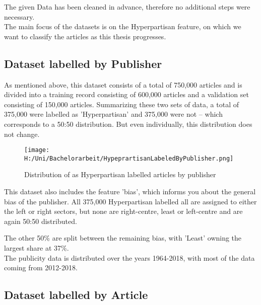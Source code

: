 \documentclass[11pt,titlepage,oneside,openany]{book}
\begin{document}
 \noindent The given Data has been cleaned in advance, therefore no additional steps were necessary.\\ 
 The main focus of the datasets is on the Hyperpartisan feature, on which we want to classify the articles as this thesis progresses.
 

\subsection{Dataset labelled by Publisher}
As mentioned above, this dataset consists of a total of 750,000 articles and is divided into a training record consisting of 600,000 articles and a validation set consisting of 150,000 articles. Summarizing these two sets of data, a total of 375,000 were labelled as 'Hyperpartisan' and 375,000 were not – which corresponds to a 50:50 distribution. But even individually, this distribution does not change. 
\begin{figure}[h]
	\centering
	\texttt{[image: H:/Uni/Bachelorarbeit/HypeprartisanLabeledByPublisher.png]}
	\caption{Distribution of as Hyperpartisan labelled articles by publisher}
	\label{fig:example}
\end{figure}

\noindent This dataset also includes the feature 'bias', which informs you about the general bias of the publisher. All 375,000 Hyperpartisan labelled all are assigned to either the left or right sectors, but none are right-centre, least or left-centre and are again 50:50 distributed.


\noindent The other 50\% are split between the remaining bias, with 'Least' owning the largest share at 37\%.\\
The publicity data is distributed over the years 1964-2018, with most of the data coming from 2012-2018.
\begin{figure}[h]
	\begin{comment}
	\subfigure[Distribution of publishing years]{\texttt{[image: H:/Uni/Bachelorarbeit/Distribution\_PublishedAt\_Publisher\_AllYears.png]}} 
	\end{comment}
\end{figure}


\subsection{Dataset labelled by Article}
\end{document}
